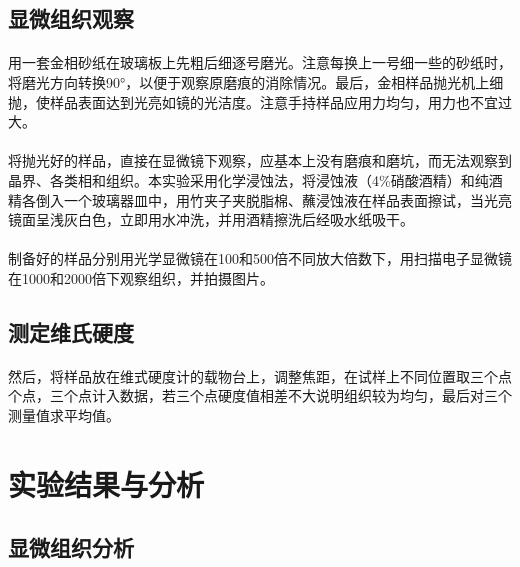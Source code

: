 \documentclass[12pt]{ctexart}
\begin{document}
\subsection{显微组织观察}
\paragraph{}
用一套金相砂纸在玻璃板上先粗后细逐号磨光。注意每换上一号细一些的砂纸时，将磨光方向转换90°，以便于观察原磨痕的消除情况。最后，金相样品抛光机上细抛，使样品表面达到光亮如镜的光洁度。注意手持样品应用力均匀，用力也不宜过大。
\paragraph{}
将抛光好的样品，直接在显微镜下观察，应基本上没有磨痕和磨坑，而无法观察到晶界、各类相和组织。本实验采用化学浸蚀法，将浸蚀液（4\%硝酸酒精）和纯酒精各倒入一个玻璃器皿中，用竹夹子夹脱脂棉、蘸浸蚀液在样品表面擦试，当光亮镜面呈浅灰白色，立即用水冲洗，并用酒精擦洗后经吸水纸吸干。
\paragraph{}
制备好的样品分别用光学显微镜在100和500倍不同放大倍数下，用扫描电子显微镜在1000和2000倍下观察组织，并拍摄图片。
\subsection{测定维氏硬度}
\paragraph{}
然后，将样品放在维式硬度计的载物台上，调整焦距，在试样上不同位置取三个点个点，三个点计入数据，若三个点硬度值相差不大说明组织较为均匀，最后对三个测量值求平均值。

\section{实验结果与分析}
\subsection{显微组织分析}
\end{document}
